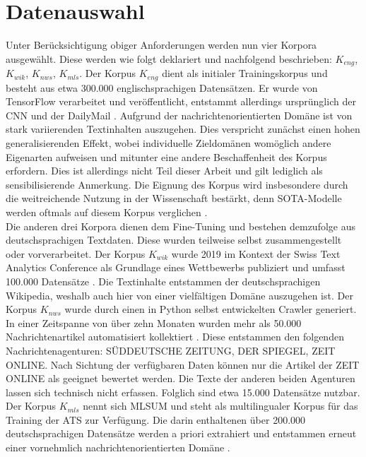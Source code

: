 \section{Datenauswahl}
\noindent
Unter Berücksichtigung obiger Anforderungen werden nun vier Korpora ausgewählt. Diese werden wie folgt deklariert und nachfolgend beschrieben: $K_{eng}$, $K_{wik}$, $K_{nws}$, $K_{mls}$. Der Korpus $K_{eng}$ dient als initialer Trainingskorpus und besteht aus etwa 300.000 englischsprachigen Datensätzen. Er wurde von TensorFlow verarbeitet und veröffentlicht, entstammt allerdings ursprünglich der CNN und der DailyMail \cite{TEN21}. Aufgrund der nachrichtenorientierten Domäne ist von stark variierenden Textinhalten auszugehen. Dies verspricht zunächst einen hohen generalisierenden Effekt, wobei individuelle Zieldomänen womöglich andere Eigenarten aufweisen und mitunter eine andere Beschaffenheit des Korpus erfordern. Dies ist allerdings nicht Teil dieser Arbeit und gilt lediglich als sensibilisierende Anmerkung. Die Eignung des Korpus wird insbesondere durch die weitreichende Nutzung in der Wissenschaft bestärkt, denn \ac{SOTA}-Modelle werden oftmals auf diesem Korpus verglichen \cite[S.~6]{ROT20}.\\

\noindent
Die anderen drei Korpora dienen dem Fine-Tuning und bestehen demzufolge aus deutschsprachigen Textdaten. Diese wurden teilweise selbst zusammengestellt oder vorverarbeitet. Der Korpus $K_{wik}$ wurde 2019 im Kontext der Swiss Text Analytics Conference als Grundlage eines Wettbewerbs publiziert und umfasst 100.000 Datensätze \cite{CIE19}. Die Textinhalte entstammen der deutschsprachigen Wikipedia, weshalb auch hier von einer vielfältigen Domäne auszugehen ist. Der Korpus $K_{nws}$ wurde durch einen in Python selbst entwickelten Crawler generiert. In einer Zeitspanne von über zehn Monaten wurden mehr als 50.000 Nachrichtenartikel automatisiert kollektiert \cite[S.~79,~83,~416]{BIR09}. Diese entstammen den folgenden Nachrichtenagenturen: SÜDDEUTSCHE ZEITUNG, DER SPIEGEL, ZEIT ONLINE. Nach Sichtung der verfügbaren Daten können nur die Artikel der ZEIT ONLINE als geeignet bewertet werden. Die Texte der anderen beiden Agenturen lassen sich technisch nicht erfassen. Folglich sind etwa 15.000 Datensätze nutzbar. Der Korpus $K_{mls}$ nennt sich MLSUM und steht als multilingualer Korpus für das Training der \ac{ATS} zur Verfügung. Die darin enthaltenen über 200.000 deutschsprachigen Datensätze werden a priori extrahiert und entstammen erneut einer vornehmlich nachrichtenorientierten Domäne \cite{SCI20}.\\

